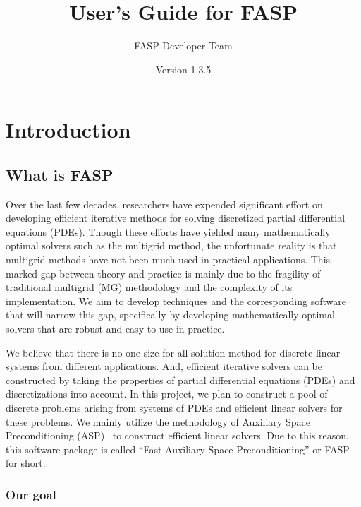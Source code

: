 \documentclass[11pt]{memoir}
\title{User's Guide for FASP}
\author{FASP Developer Team}
\date{Version 1.3.5} %
\begin{document}
\maketitle

\newpage
\tableofcontents

\chapter{Introduction}\label{ch:intro}

\section{What is FASP}\label{sec:goal}

Over the last few decades, researchers have expended significant effort on developing efficient iterative methods for solving discretized partial differential equations (PDEs). Though these efforts have yielded many mathematically optimal solvers such as the multigrid method, the unfortunate reality is that multigrid methods have not been much used in practical applications. This marked gap between theory and practice is mainly due to the fragility of traditional multigrid (MG) methodology and the complexity of its implementation. We aim to develop techniques and the corresponding software that will narrow this gap, specifically by developing mathematically optimal solvers that are robust and easy to use in practice.

We believe that there is no one-size-for-all solution method for discrete linear systems from different applications. And, efficient iterative solvers can be constructed by taking the properties of partial differential equations (PDEs) and discretizations into account. In this project, we plan to construct a pool of discrete problems arising from systems of PDEs and efficient linear solvers for these problems. We mainly utilize the methodology of Auxiliary Space Preconditioning (ASP)~\cite{Xu.Xu.2010ff} to construct efficient linear solvers. Due to this reason, this software package is called ``Fast Auxiliary Space Preconditioning'' or FASP for short.

\subsection{Our goal}
\end{document}
